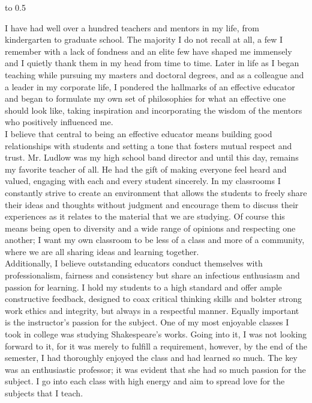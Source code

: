 

\noindent\hbox to 0.5\textwidth{}


I have had well over a hundred teachers and mentors in my life, from kindergarten to graduate school.  The majority I do not recall at all, a few I remember with a lack of fondness and an elite few have shaped me immensely and I quietly thank them in my head from time to time.  Later in life as I began teaching while pursuing my masters and doctoral degrees, and as a colleague and a leader in my corporate life,  I pondered the hallmarks of an effective educator and began to formulate my own set of philosophies for what an effective one should look like, taking inspiration and incorporating the wisdom of the mentors who positively influenced me. \\
\vspace{2ex}
I believe that central to being an effective educator means building good relationships with students and setting a tone that fosters mutual respect and trust.  Mr. Ludlow was my high school band director and until this day, remains my favorite teacher of all.  He had the gift of making everyone feel heard and valued, engaging with each and every student sincerely.  In my classrooms I constantly strive to create an environment that allows the students to freely share their ideas and thoughts without judgment and encourage them to discuss their experiences as it relates to the material that we are studying.  Of course this means being open to diversity and a wide range of opinions and respecting one another; I want my own classroom to be less of a class and more of a community, where we are all sharing ideas and learning together. \\
\vspace{2ex}
Additionally, I believe outstanding educators conduct themselves with professionalism, fairness and consistency but share an infectious enthusiasm and passion for learning.  I hold my students to a high standard and offer ample constructive feedback, designed to coax critical thinking skills and bolster strong work ethics and integrity, but always in a respectful manner.  Equally important is the instructor's passion for the subject.  One of my most enjoyable classes I took in college was studying Shakespeare's works.  Going into it, I was not looking forward to it, for it was merely to fulfill a requirement, however, by the end of the semester, I had thoroughly enjoyed the class and had learned so much.  The key was an enthusiastic professor; it was evident that she had so much passion for the subject.  I go into each class with high energy and aim to spread love for the subjects that I teach. \\
